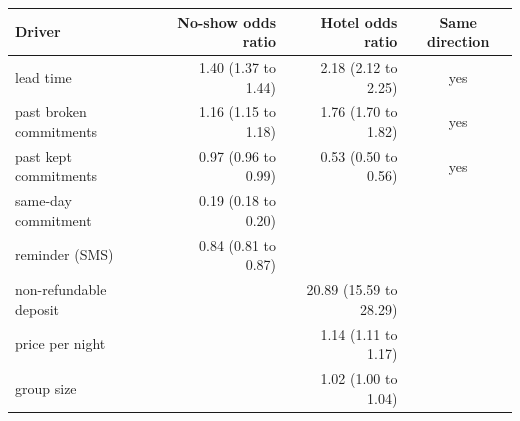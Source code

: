 \begin{tabular}{lrrc}
\toprule
Driver & No-show odds ratio & Hotel odds ratio & Same direction \\
\midrule
lead time & 1.40 (1.37 to 1.44) & 2.18 (2.12 to 2.25) & yes \\
past broken commitments & 1.16 (1.15 to 1.18) & 1.76 (1.70 to 1.82) & yes \\
past kept commitments & 0.97 (0.96 to 0.99) & 0.53 (0.50 to 0.56) & yes \\
same-day commitment & 0.19 (0.18 to 0.20) &  &  \\
reminder (SMS) & 0.84 (0.81 to 0.87) &  &  \\
non-refundable deposit &  & 20.89 (15.59 to 28.29) &  \\
price per night &  & 1.14 (1.11 to 1.17) &  \\
group size &  & 1.02 (1.00 to 1.04) &  \\
\bottomrule
\end{tabular}
